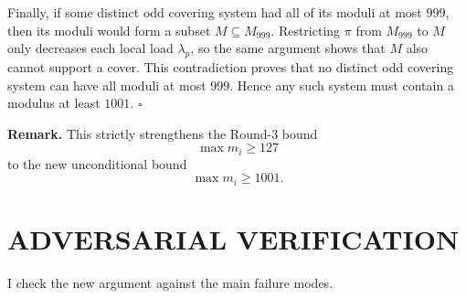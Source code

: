 Finally, if some distinct odd covering system had all of its moduli at most \(999\), then its moduli would form a subset \(M\subseteq M_{999}\). Restricting \(\pi\) from \(M_{999}\) to \(M\) only decreases each local load \(\lambda_p\), so the same argument shows that \(M\) also cannot support a cover. This contradiction proves that no distinct odd covering system can have all moduli at most \(999\). Hence any such system must contain a modulus at least \(1001\). \hfill\(\square\)

\medskip
\noindent\textbf{Remark.}
This strictly strengthens the Round-3 bound
\[
\max m_i \ge 127
\]
to the new unconditional bound
\[
\max m_i \ge 1001.
\]

\section{ADVERSARIAL VERIFICATION}

I check the new argument against the main failure modes.

